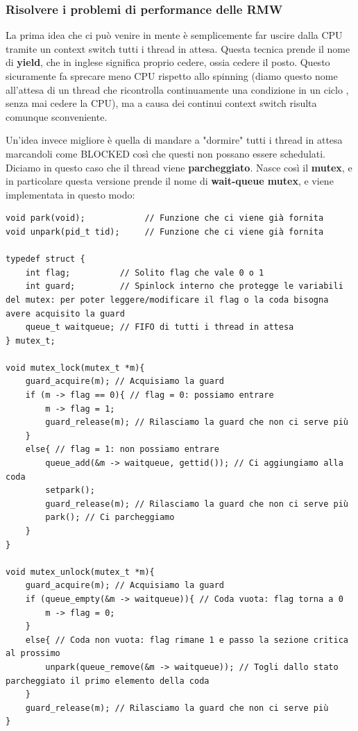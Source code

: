 \documentclass[11pt, a4paper, titlepage, oneside]{scrbook}
\begin{document}
\subsubsection*{Risolvere i problemi di performance delle RMW}

La prima idea che ci può venire in mente è semplicemente far uscire dalla CPU tramite un context switch tutti i thread in attesa. Questa tecnica prende il nome di \textbf{yield}, che in inglese significa proprio cedere, ossia cedere il posto. Questo sicuramente fa sprecare meno CPU rispetto allo spinning (diamo questo nome all'attesa di un thread che ricontrolla continuamente una
condizione in un ciclo , senza mai cedere la CPU), ma a causa dei continui context switch risulta comunque sconveniente.

Un'idea invece migliore è quella di mandare a "dormire" tutti i thread in attesa marcandoli come BLOCKED così che questi non possano essere schedulati. Diciamo in questo caso che il thread viene \textbf{parcheggiato}. Nasce così il \textbf{mutex}, e in particolare questa versione prende il nome di \textbf{wait-queue mutex}, e viene implementata in questo modo:

\begin{lstlisting}[style=C]
void park(void);            // Funzione che ci viene già fornita
void unpark(pid_t tid);     // Funzione che ci viene già fornita

typedef struct {
    int flag;          // Solito flag che vale 0 o 1
    int guard;         // Spinlock interno che protegge le variabili del mutex: per poter leggere/modificare il flag o la coda bisogna avere acquisito la guard
    queue_t waitqueue; // FIFO di tutti i thread in attesa
} mutex_t;

void mutex_lock(mutex_t *m){
    guard_acquire(m); // Acquisiamo la guard
    if (m -> flag == 0){ // flag = 0: possiamo entrare
        m -> flag = 1;
        guard_release(m); // Rilasciamo la guard che non ci serve più
    }
    else{ // flag = 1: non possiamo entrare
        queue_add(&m -> waitqueue, gettid()); // Ci aggiungiamo alla coda
        setpark();
        guard_release(m); // Rilasciamo la guard che non ci serve più
        park(); // Ci parcheggiamo
    }
}

void mutex_unlock(mutex_t *m){
    guard_acquire(m); // Acquisiamo la guard
    if (queue_empty(&m -> waitqueue)){ // Coda vuota: flag torna a 0
        m -> flag = 0;
    }
    else{ // Coda non vuota: flag rimane 1 e passo la sezione critica al prossimo
        unpark(queue_remove(&m -> waitqueue)); // Togli dallo stato parcheggiato il primo elemento della coda
    }
    guard_release(m); // Rilasciamo la guard che non ci serve più
}
\end{lstlisting}
\end{document}
